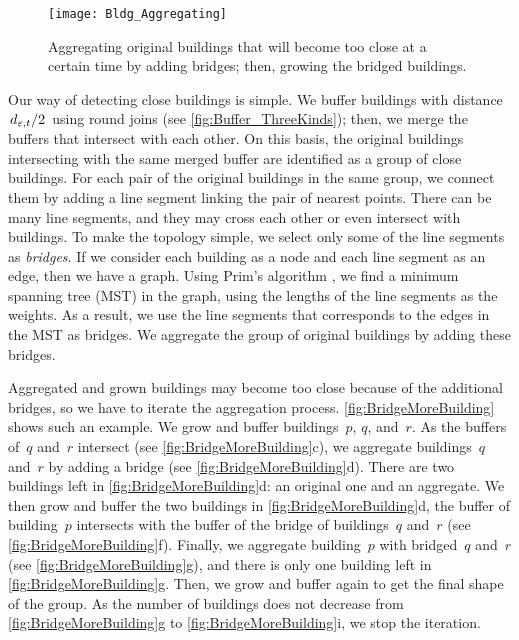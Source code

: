 \begin{figure}[tb]
	\centering
	\texttt{[image: Bldg\_Aggregating]}
	\caption{Aggregating original buildings 
		that will become too close at a certain time 
		by adding bridges;
		then, growing the bridged buildings.}
	\label{fig:GrowAndBridge}
\end{figure}

Our way of detecting close buildings is simple.
We buffer buildings with distance 
$\left. d_{\varepsilon,t}\middle/2 \right.$
using round joins
(see \fig\ref{fig:Buffer_ThreeKinds});
then, we merge the buffers that intersect with each other.
On this basis, 
the original buildings intersecting with the same merged buffer 
are identified as a group of close buildings.
For each pair of the original buildings in the same group,
we connect them by adding a line segment 
linking the pair of nearest points.
There can be many line segments, 
and they may cross each other or even intersect with buildings.
To make the topology simple, 
we select only some of the line segments as \emph{bridges}.  
If we consider each building as a node and 
each line segment as an edge, 
then we have a graph.
Using Prim's algorithm \citep{Prim1957}, 
we find a minimum spanning tree (MST) in the graph,
using the lengths of the line segments as the weights.
As a result, we use the line segments 
that corresponds to the edges in the MST as bridges.
We aggregate the group of original buildings 
by adding these bridges.

Aggregated and grown buildings may become too close 
because of the additional bridges,
so we have to iterate the aggregation process.
\fig\ref{fig:BridgeMoreBuilding} shows such an example.
We grow and buffer buildings~$p$, $q$, and~$r$.
As the buffers of~$q$ and~$r$ intersect
(see \fig\ref{fig:BridgeMoreBuilding}c),
we aggregate buildings~$q$ and~$r$ by adding a bridge
(see \fig\ref{fig:BridgeMoreBuilding}d).
There are two buildings left in 
\fig\ref{fig:BridgeMoreBuilding}d:
an original one and an aggregate.
We then grow and buffer the two buildings in 
\fig\ref{fig:BridgeMoreBuilding}d, 
the buffer of building~$p$ intersects with
the buffer of the bridge of buildings~$q$ and~$r$
(see \fig\ref{fig:BridgeMoreBuilding}f).
Finally, we aggregate building~$p$ with bridged~$q$ and~$r$
(see \fig\ref{fig:BridgeMoreBuilding}g), 
and there is only one building left in 
\fig\ref{fig:BridgeMoreBuilding}g.
Then, we grow and buffer again 
to get the final shape of the group.
As the number of buildings 
does not decrease from \fig\ref{fig:BridgeMoreBuilding}g
to \fig\ref{fig:BridgeMoreBuilding}i,
we stop the iteration.

